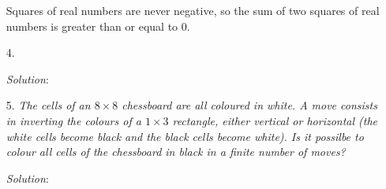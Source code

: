 \documentclass{article}
\begin{document}
\begin{enumerate}[1.]
Squares of real numbers are never negative, so the sum of two squares of real numbers is greater than or equal to 0.\\

\vspace{6.81mm}

\item[4.] %
\textit{}

\textit{Solution}:
\vspace{6.81mm}

\item[5.] %
\textit{The cells of an $8 \times 8$ chessboard are all coloured in white. A move consists in inverting the colours of a $1 \times 3$ rectangle, either vertical or horizontal (the white cells become black and the black cells become white).
Is it possilbe to colour all cells of the chessboard in black in a finite number of moves?}

\textit{Solution}: 


\end{enumerate}
\end{document}

